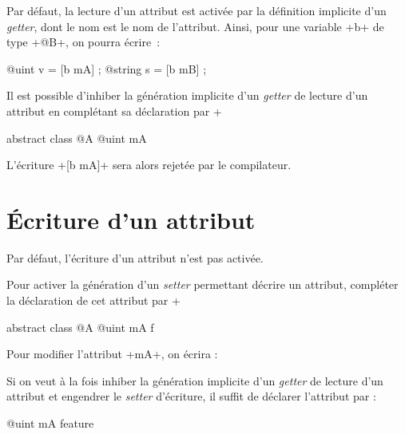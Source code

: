 Par défaut, la lecture d'un attribut est activée par la définition implicite d'un \emph{getter}, dont le nom est le nom de l'attribut. Ainsi, pour une variable \ggs+b+ de type \ggs+@B+, on pourra écrire~:

\begin{galgas}
@uint v = [b mA] ;
@string s = [b mB] ;
\end{galgas}

Il est possible d'inhiber la génération implicite d'un \emph{getter} de lecture d'un attribut en complétant sa déclaration par \ggs+%

\begin{galgas}
abstract class @A {
  @uint mA %
}
\end{galgas}

L'écriture \ggs+[b mA]+ sera alors rejetée par le compilateur.









\section{Écriture d'un attribut}

Par défaut, l'écriture d'un attribut n'est pas activée.

Pour activer la génération d'un \emph{setter} permettant décrire un attribut, compléter la déclaration de cet attribut par \ggs+%

\begin{galgas}
abstract class @A {
  @uint mA f%
}
\end{galgas}


Pour modifier l'attribut \ggs+mA+, on écrira :

\begin{galgas}
[!?b setMA !12]
\end{galgas}

Si on veut à la fois inhiber la génération implicite d'un \emph{getter} de lecture d'un attribut et engendrer le \emph{setter} d'écriture, il suffit de déclarer l'attribut par :

\begin{galgas}
  @uint mA feature %
\end{galgas}

